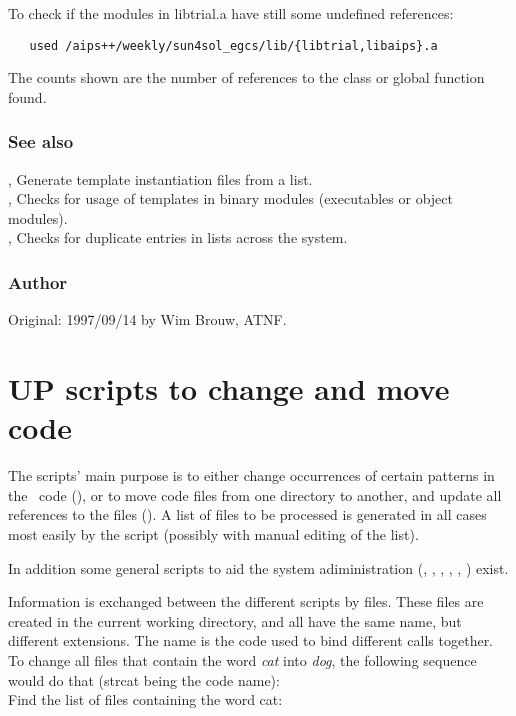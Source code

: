 To check if the modules in libtrial.a have still some undefined references:

\begin{verbatim}
   used /aips++/weekly/sun4sol_egcs/lib/{libtrial,libaips}.a
\end{verbatim}

The counts shown are the number of references to the class or global function
found.

\subsubsection*{See also}

, Generate template instantiation files from a list.\\
, Checks for usage of templates in binary modules (executables
or object modules).\\
, Checks for duplicate entries in  lists
   across the system.

\subsubsection*{Author}

Original: 1997/09/14 by Wim Brouw, ATNF.


\newpage
\section{UP scripts to change and move code}
\label{UPscripts}

The  scripts' main purpose is to either change occurrences of
certain patterns in the \aipspp\ code (), or to move code
files from one directory to another, and update all references to the files
(). A list of files to be processed is generated in all cases
most easily by the  script (possibly with manual editing of
the list). 

\noindent
In addition some general scripts to aid the system adiministration
(, , ,  
, , ) exist.

\noindent
Information is exchanged between the different scripts by files. These files
are created in the current working directory, and all have the same name, but
different extensions. The name is the code used to bind different calls
together. To change all files that contain the word {\em cat} into {\em dog},
the following sequence would do that (strcat being the code name): \\
Find the list of files containing the word cat:

